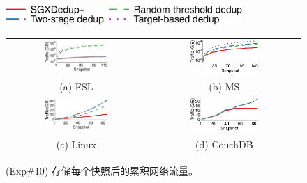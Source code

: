 \begin{figure}[t]
    \centering
    \includegraphics[width=0.8\textwidth]{pic/featurespy/plot/bandwidth/upload_traffic_legend.pdf}     \vspace{3pt} \\
    \begin{tabular}{@{\ }c@{\ }c}
        \includegraphics[width=0.47\textwidth]{pic/featurespy/plot/bandwidth/upload_traffic_fsl.pdf} &
        \includegraphics[width=0.47\textwidth]{pic/featurespy/plot/bandwidth/upload_traffic_ms.pdf} \\
        {\small (a) FSL} & {\small (b) MS} \\
        \includegraphics[width=0.47\textwidth]{pic/featurespy/plot/bandwidth/upload_traffic_linux.pdf} &
        \includegraphics[width=0.47\textwidth]{pic/featurespy/plot/bandwidth/upload_traffic_couch.pdf} \\
        {\small (c) Linux} & {\small (d) CouchDB}
    \end{tabular}
    \vspace{-6pt}
    \caption{(Exp\#10) 存储每个快照后的累积网络流量。}
    \vspace{-6pt}
    \label{fig:featurespy-expNetworkTraffic}
\end{figure}

